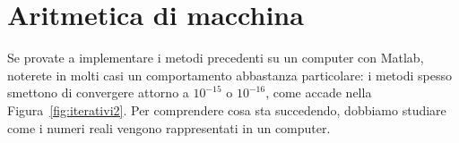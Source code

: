 \documentclass[a4paper]{report}
\DeclarePairedDelimiter{\abs}{\lvert}{\rvert}
\theoremstyle{definiton}
\theoremstyle{remark}
\begin{document}

\chapter{Aritmetica di macchina}


Se provate a implementare i metodi precedenti su un computer con Matlab, noterete in molti casi un comportamento abbastanza particolare: i metodi spesso smettono di convergere attorno a $10^{-15}$ o $10^{-16}$, come accade nella Figura~\ref{fig:iterativi2}. Per comprendere cosa sta succedendo, dobbiamo studiare come i numeri reali vengono rappresentati in un computer.
\end{document}
